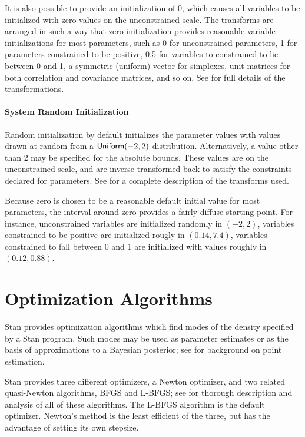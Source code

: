 It is also possible to provide an initialization of 0, which causes
all variables to be initialized with zero values on the unconstrained
scale. The transforms are arranged in such a way that zero
initialization provides reasonable variable initializations for most
parameters, such as 0 for unconstrained parameters, 1 for parameters
constrained to be positive, 0.5 for variables to constrained to lie
between 0 and 1, a symmetric (uniform) vector for simplexes, unit
matrices for both correlation and covariance matrices, and so on. See
 for full details of the
transformations.


\subsubsection{System Random Initialization}

Random initialization by default initializes the parameter values with
values drawn at random from a $\distro{Uniform}(-2,2)$ distribution.
Alternatively, a value other than 2 may be specified for the absolute
bounds. These values are on the unconstrained scale, and are inverse
transformed back to satisfy the constraints declared for parameters.
See  for a complete description of the
transforms used.  

Because zero is chosen to be a reasonable default initial value for
most parameters, the interval around zero provides a fairly diffuse
starting point. For instance, unconstrained variables are initialized
randomly in $(-2,2)$, variables constrained to be positive are
initialized rougly in $(0.14,7.4)$, variables constrained to fall
between 0 and 1 are initialized with values roughly in $(0.12,0.88)$.


\chapter{Optimization  Algorithms}%
\label{optimization-algorithms.chapter}

\noindent
Stan provides optimization algorithms which find modes of the density
specified by a Stan program. Such modes may be used as parameter
estimates or as the basis of approximations to a Bayesian posterior;
see  for background on point estimation.

Stan provides three different optimizers, a Newton optimizer, and two
related quasi-Newton algorithms, BFGS and L-BFGS; see
\citep{NocedalWright:2006} for thorough description and analysis of
all of these algorithms. The L-BFGS algorithm is the default
optimizer. Newton's method is the least efficient of the three, but
has the advantage of setting its own stepsize.

